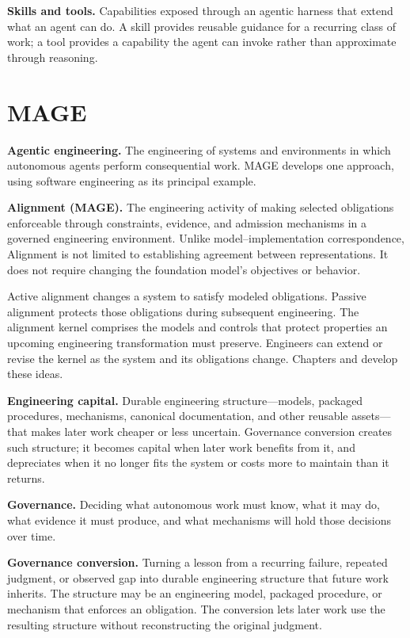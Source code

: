 \textbf{Skills and tools.} Capabilities exposed through an agentic harness that extend what an agent can do. A skill provides reusable guidance for a recurring class of work; a tool provides a capability the agent can invoke rather than approximate through reasoning.

\section{MAGE}\label{heading:mage}

\textbf{Agentic engineering.} The engineering of systems and environments in which autonomous agents perform consequential work. MAGE develops one approach, using software engineering as its principal example.

\textbf{Alignment (MAGE).} The engineering activity of making selected obligations enforceable through constraints, evidence, and admission mechanisms in a governed engineering environment. Unlike model--implementation correspondence, Alignment is not limited to establishing agreement between representations. It does not require changing the foundation model's objectives or behavior.

Active alignment changes a system to satisfy modeled obligations. Passive alignment protects those obligations during subsequent engineering. The alignment kernel comprises the models and controls that protect properties an upcoming engineering transformation must preserve. Engineers can extend or revise the kernel as the system and its obligations change. Chapters  and  develop these ideas.


\textbf{Engineering capital.} Durable engineering structure---models, packaged procedures, mechanisms, canonical documentation, and other reusable assets---that makes later work cheaper or less uncertain. Governance conversion creates such structure; it becomes capital when later work benefits from it, and depreciates when it no longer fits the system or costs more to maintain than it returns.

\textbf{Governance.} Deciding what autonomous work must know, what it may do, what evidence it must produce, and what mechanisms will hold those decisions over time.

\textbf{Governance conversion.} Turning a lesson from a recurring failure, repeated judgment, or observed gap into durable engineering structure that future work inherits. The structure may be an engineering model, packaged procedure, or mechanism that enforces an obligation. The conversion lets later work use the resulting structure without reconstructing the original judgment.

